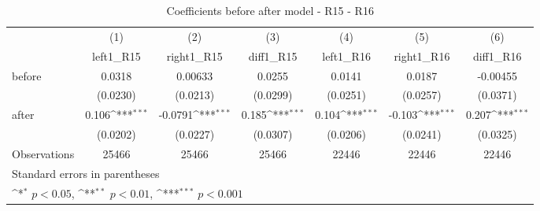 \begin{table}[!ht]\centering \footnotesize
\def\sym#1{\ifmmode^{#1}\else\(^{#1}\)\fi}
\caption{Coefficients before after model - R15 - R16}
\begin{tabular}{l*{6}{c}}
\hline\hline
                    &\multicolumn{1}{c}{(1)}&\multicolumn{1}{c}{(2)}&\multicolumn{1}{c}{(3)}&\multicolumn{1}{c}{(4)}&\multicolumn{1}{c}{(5)}&\multicolumn{1}{c}{(6)}\\
                    &\multicolumn{1}{c}{left1\_R15}&\multicolumn{1}{c}{right1\_R15}&\multicolumn{1}{c}{diff1\_R15}&\multicolumn{1}{c}{left1\_R16}&\multicolumn{1}{c}{right1\_R16}&\multicolumn{1}{c}{diff1\_R16}\\
\hline
before              &      0.0318         &     0.00633         &      0.0255         &      0.0141         &      0.0187         &    -0.00455         \\
                    &    (0.0230)         &    (0.0213)         &    (0.0299)         &    (0.0251)         &    (0.0257)         &    (0.0371)         \\
[1em]
after               &       0.106\sym{***}&     -0.0791\sym{***}&       0.185\sym{***}&       0.104\sym{***}&      -0.103\sym{***}&       0.207\sym{***}\\
                    &    (0.0202)         &    (0.0227)         &    (0.0307)         &    (0.0206)         &    (0.0241)         &    (0.0325)         \\
\hline
Observations        &       25466         &       25466         &       25466         &       22446         &       22446         &       22446         \\
\hline\hline
\multicolumn{7}{l}{\footnotesize Standard errors in parentheses}\\
\multicolumn{7}{l}{\footnotesize \sym{*} \(p<0.05\), \sym{**} \(p<0.01\), \sym{***} \(p<0.001\)}\\
\end{tabular}
\end{table}
